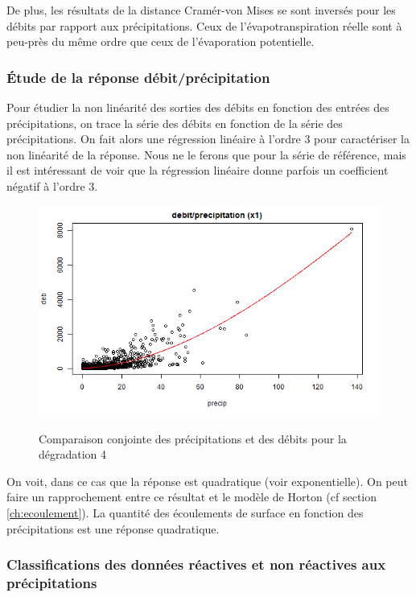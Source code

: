 \documentclass[a4paper,11pt]{article}
\numberwithin{equation}{section}
\begin{document}
De plus, les résultats de la distance Cramér-von Mises se sont inversés pour les débits par rapport aux précipitations. Ceux de l'évapotranspiration réelle sont à peu-près du même ordre que ceux de l'évaporation potentielle. 

\subsubsection{Étude de la réponse débit/précipitation}

Pour étudier la non linéarité des sorties des débits en fonction des entrées des précipitations, on trace la série des débits en fonction de la série des précipitations. On fait alors une régression linéaire à l'ordre 3 pour caractériser la non linéarité de la réponse. Nous ne le ferons que pour la série de référence, mais il est intéressant de voir que la régression linéaire donne parfois un coefficient négatif à l'ordre 3.
  
\begin{figure}[H]
	\begin{center}
		\includegraphics[scale=0.45]{images/deb_rapport_pr_deg1.png}\\
	\end{center}
	\caption{Comparaison conjointe des précipitations et des débits pour la dégradation 4}
\end{figure} 

On voit, dans ce cas que la réponse est quadratique (voir exponentielle). On peut faire un rapprochement entre ce résultat et le modèle de Horton (cf section \ref{ch:ecoulement}). La quantité des écoulements de surface en fonction des précipitations est une réponse quadratique.

\subsubsection{Classifications des données réactives et non réactives aux précipitations}
\label{ch:classification delta deb delta pluie}
\end{document}
